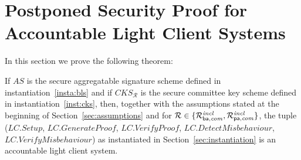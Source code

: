 \section{Postponed Security Proof for Accountable Light Client Systems}
\label{supplementary_proof_sec_accountability}

\noindent In this section we prove the following theorem:

\begin{theorem} 
\label{th:accountability_results}
If $\mathit{AS}$ is the secure aggregatable signature scheme defined in instantiation~\ref{insta:bls} and if 
$\mathit{CKS_{\mathcal{R}}}$ is the secure committee key scheme defined in instantiation~\ref{inst:cks}, then, together 
with the assumptions stated at the beginning of Section~\ref{sec:assumptions} and for $\mathcal{R} \in \{ \mathcal{R}^{\mathit{incl}}_{\mathsf{ba},\mathit{com}}, \mathcal{R}^{\mathit{incl}}_{\mathsf{pa},\mathit{com}} \}$, the tuple 
($\mathit{LC.Setup}$, $\mathit{LC.GenerateProof}$, $\mathit{LC.VerifyProof}$, $\mathit{LC.DetectMisbehaviour}$, 
$\mathit{LC.VerifyMisbehaviour}$) as instantiated in Section~\ref{sec:instantiation} is an accountable light client system.
\end{theorem}
